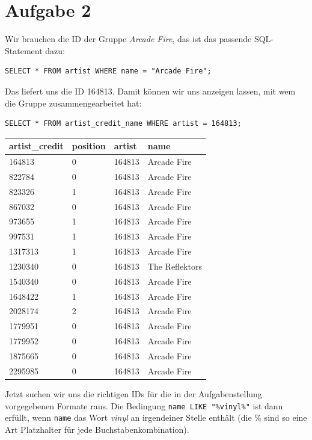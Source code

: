 \documentclass{article}
\begin{document}
	\section*{Aufgabe 2}
	Wir brauchen die ID der Gruppe \textit{Arcade Fire}, das ist das passende SQL-Statement dazu:
	\begin{lstlisting}[style=sql]
SELECT * FROM artist WHERE name = "Arcade Fire";
	\end{lstlisting}
	Das liefert uns die ID 164813. Damit können wir uns anzeigen lassen, mit wem die Gruppe zusammengearbeitet hat:
	\begin{lstlisting}[style=sql]
SELECT * FROM artist_credit_name WHERE artist = 164813;
	\end{lstlisting}
	\begin{center}
		\begin{tabular}{l|l|l|l}
			\textbf{artist\_credit} & \textbf{position} & \textbf{artist} & \textbf{name} \\ \hline
			164813 & 0 & 164813 & Arcade Fire \\ \hline
			822784 & 0 & 164813 & Arcade Fire \\ \hline
			823326 & 1 & 164813 & Arcade Fire \\ \hline
			867032 & 0 & 164813 & Arcade Fire \\ \hline
			973655 & 1 & 164813 & Arcade Fire \\ \hline
			997531 & 1 & 164813 & Arcade Fire \\ \hline
			1317313 & 1 & 164813 & Arcade Fire \\ \hline
			1230340 & 0 & 164813 & The Reflektors \\ \hline
			1540340 & 0 & 164813 & Arcade Fire \\ \hline
			1648422 & 1 & 164813 & Arcade Fire \\ \hline
			2028174 & 2 & 164813 & Arcade Fire \\ \hline
			1779951 & 0 & 164813 & Arcade Fire \\ \hline
			1779952 & 0 & 164813 & Arcade Fire \\ \hline
			1875665 & 0 & 164813 & Arcade Fire \\ \hline
			2295985 & 0 & 164813 & Arcade Fire
		\end{tabular}
	\end{center}
	Jetzt suchen wir uns die richtigen IDs für die in der Aufgabenstellung vorgegebenen Formate raus. Die Bedingung \texttt{name LIKE "\%vinyl\%"} ist dann erfüllt, wenn \texttt{name} das Wort \textit{vinyl} an irgendeiner Stelle enthält (die \% sind so eine Art Platzhalter für jede Buchstabenkombination).
\end{document}

